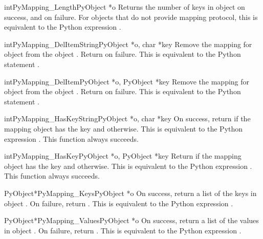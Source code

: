 \begin{cfuncdesc}{int}{PyMapping_Length}{PyObject *o}
  Returns the number of keys in object  on success, and
   on failure.  For objects that do not provide mapping
  protocol, this is equivalent to the Python expression
  .
\end{cfuncdesc}


\begin{cfuncdesc}{int}{PyMapping_DelItemString}{PyObject *o, char *key}
  Remove the mapping for object  from the object .
  Return  on failure.  This is equivalent to the Python
  statement .
\end{cfuncdesc}


\begin{cfuncdesc}{int}{PyMapping_DelItem}{PyObject *o, PyObject *key}
  Remove the mapping for object  from the object .
  Return  on failure.  This is equivalent to the Python
  statement .
\end{cfuncdesc}


\begin{cfuncdesc}{int}{PyMapping_HasKeyString}{PyObject *o, char *key}
  On success, return  if the mapping object has the key
   and  otherwise.  This is equivalent to the Python
  expression .  This function always
  succeeds.
\end{cfuncdesc}


\begin{cfuncdesc}{int}{PyMapping_HasKey}{PyObject *o, PyObject *key}
  Return  if the mapping object has the key  and
   otherwise.  This is equivalent to the Python expression
  .  This function always succeeds.
\end{cfuncdesc}


\begin{cfuncdesc}{PyObject*}{PyMapping_Keys}{PyObject *o}
  On success, return a list of the keys in object .  On
  failure, return \NULL. This is equivalent to the Python expression
  .
\end{cfuncdesc}


\begin{cfuncdesc}{PyObject*}{PyMapping_Values}{PyObject *o}
  On success, return a list of the values in object .  On
  failure, return \NULL. This is equivalent to the Python expression
  .
\end{cfuncdesc}


